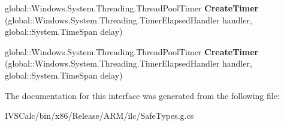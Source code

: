 \begin{DoxyCompactItemize}
global\+::\+Windows.\+System.\+Threading.\+Thread\+Pool\+Timer {\bfseries Create\+Timer} (global\+::\+Windows.\+System.\+Threading.\+Timer\+Elapsed\+Handler handler, global\+::\+System.\+Time\+Span delay)
\item 
\mbox{\label{interface_windows_1_1_system_1_1_threading_1_1_i_thread_pool_timer_statics_a2ef4b3c10d4a1169d21709cc458143f0}} 
global\+::\+Windows.\+System.\+Threading.\+Thread\+Pool\+Timer {\bfseries Create\+Timer} (global\+::\+Windows.\+System.\+Threading.\+Timer\+Elapsed\+Handler handler, global\+::\+System.\+Time\+Span delay)
\end{DoxyCompactItemize}


The documentation for this interface was generated from the following file\+:\begin{DoxyCompactItemize}
\item 
I\+V\+S\+Calc/bin/x86/\+Release/\+A\+R\+M/ilc/Safe\+Types.\+g.\+cs\end{DoxyCompactItemize}
